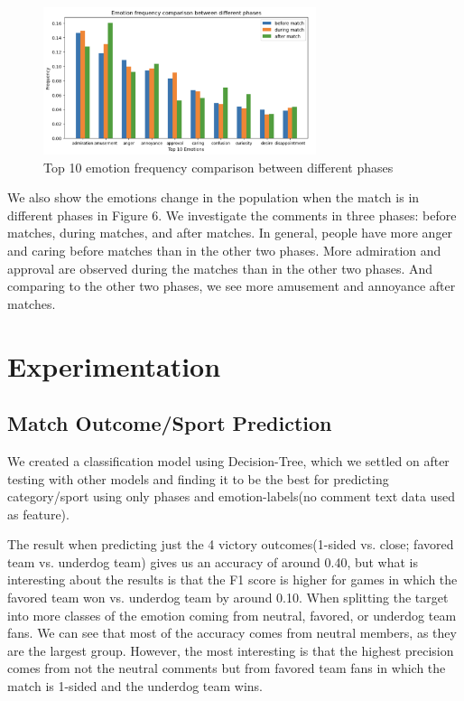 \documentclass{article}
\begin{document}
\begin{figure}[h]
    \includegraphics[width=8cm]{PhasesComparision.png}
    \caption{Top 10 emotion frequency comparison between different phases}
\end{figure}

We also show the emotions change in the population when the match is in different phases in Figure 6. We investigate the comments in three phases: before matches, during matches, and after matches. In general, people have more anger and caring before matches than in the other two phases. More admiration and approval are observed during the matches than in the other two phases. And comparing to the other two phases, we see more amusement and annoyance after matches.


\section{Experimentation}

\subsection{Match Outcome/Sport Prediction}
We created a classification model using Decision-Tree, which we settled on after testing with other models and finding it to be the best for predicting category/sport using only phases and emotion-labels(no comment text data used as feature). 

The result when predicting just the 4 victory outcomes(1-sided vs. close; favored team vs. underdog team) gives us an accuracy of around 0.40, but what is interesting about the results is that the F1 score is higher for games in which the favored team won vs. underdog team by around 0.10. When splitting the target into more classes of the emotion coming from neutral, favored, or underdog team fans. We can see that most of the accuracy comes from neutral members, as they are the largest group. However, the most interesting is that the highest precision comes from not the neutral comments but from favored team fans in which the match is 1-sided and the underdog team wins. 
\end{document}
